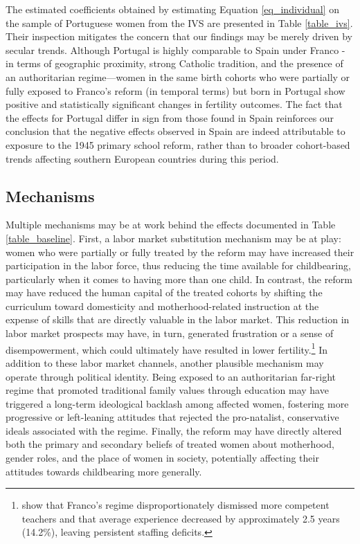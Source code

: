 \documentclass[a4paper,oneside,final,onecolumn,12pt,english]{article}
\begin{document}
The estimated coefficients obtained by estimating Equation \ref{eq_individual} on the sample of Portuguese women from the IVS are presented in Table \ref{table_ivs}. Their inspection mitigates the concern that our findings may be merely driven by secular trends. Although Portugal is highly comparable to Spain under Franco - in terms of geographic proximity, strong Catholic tradition, and the presence of an authoritarian regime—women in the same birth cohorts who were partially or fully exposed to Franco’s reform (in temporal terms) but born in Portugal show positive and statistically significant changes in fertility outcomes. The fact that the effects for Portugal differ in sign from those found in Spain reinforces our conclusion %
that the negative effects observed in Spain are indeed attributable to exposure to the 1945 primary school reform, rather than to broader cohort-based trends affecting southern European countries during this period.








\subsection{Mechanisms} \label{mech}

Multiple mechanisms may be at work behind the effects documented in Table \ref{table_baseline}. First, a labor market substitution mechanism may be at play: women who were partially or fully treated by the reform may have increased their participation in the labor force, thus reducing the time available for childbearing, particularly when it comes to having more than one child. In contrast, the reform may have reduced the human capital of the treated cohorts by shifting the curriculum toward domesticity and motherhood-related instruction at the expense of skills that are directly valuable in the labor market. This reduction in labor market prospects may have, in turn, generated frustration or a sense of disempowerment, which could ultimately have resulted in lower fertility.\footnote{\citet{grebolnavarro} show that Franco's regime disproportionately dismissed more competent teachers and that average experience decreased by approximately 2.5 years (14.2\%), leaving persistent staffing deficits.} In addition to these labor market channels, another plausible mechanism may operate through political identity. Being exposed to an authoritarian far-right regime that promoted traditional family values through education may have triggered a long-term ideological backlash among affected women, fostering more progressive or left-leaning attitudes that rejected the pro-natalist, conservative ideals associated with the regime. Finally, the reform may have directly altered both the primary and secondary beliefs of treated women about motherhood, gender roles, and the place of women in society, potentially affecting their attitudes towards childbearing more generally.
\end{document}
